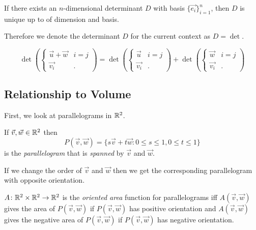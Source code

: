 \documentclass[notes.tex]{subfiles}
\begin{document}
\begin{lemma}
    If there exists an $n$-dimensional determinant $D$ with basis $\{ \vec{e_i} \}_{i = 1}^n$, then $D$ is unique up to of dimension and basis.
\end{lemma}

Therefore we denote the determinant $D$ for the current context as $D = \det$.

\begin{theorem}
    \[
        \det\left( \begin{cases}
            \vec{u} + \vec{w} & i = j \\
            \vec{v_i} & .
        \end{cases} \right)
        =
        \det\left( \begin{cases}
            \vec{u} & i = j \\
            \vec{v_i} & .
        \end{cases} \right)
        +
        \det\left( \begin{cases}
            \vec{w} & i = j \\
            \vec{v_i} & .
        \end{cases} \right)
    \]
\end{theorem}

\subsection{Relationship to Volume}
First, we look at parallelograms in $\mathbb{R}^2$.

\begin{definition}[Parallelogram]
    If $\vec{v}, \vec{w} \in \mathbb{R}^2$ then
    \[
        P(\vec{v}, \vec{w}) = \{ s\vec{v} + t\vec{w} : 0 \leq s \leq 1, 0 \leq t \leq 1 \}
    \]
    is the \textit{parallelogram} that is \textit{spanned} by $\vec{v}$ and $\vec{w}$.
\end{definition}

If we change the order of $\vec{v}$ and $\vec{w}$ then we get the corresponding parallelogram with opposite orientation.

\begin{definition}
    $A\colon \mathbb{R}^2 \times \mathbb{R}^2 \to \mathbb{R}^2$ is the \textit{oriented area} function for parallelograms iff $A(\vec{v}, \vec{w})$ gives the area of $P(\vec{v}, \vec{w})$ if $P(\vec{v}, \vec{w})$ has positive orientation and $A(\vec{v}, \vec{w})$ gives the negative area of $P(\vec{v}, \vec{w})$ if $P(\vec{v}, \vec{w})$ has negative orientation.
\end{definition}
\end{document}
